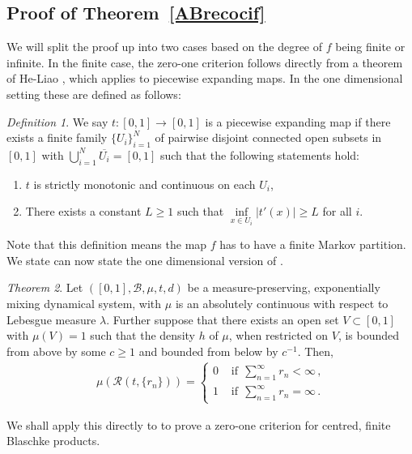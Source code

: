 \documentclass[11pt,reqno]{amsart}
\newcommand{\0}{\mathbf{0}}
\newtheorem{theorem}{Theorem}
\newtheorem{definition}{Definition}
\theoremstyle{remark}
\numberwithin{equation}{section}
\newtheorem{theorem}{Theorem}[section]
\newtheorem{definition}[theorem]{Definition}
\theoremstyle{remark}
\numberwithin{equation}{section}
\newcommand{\cR}{\mathcal{R}}
\begin{document}
\subsection{Proof of Theorem~\ref{ABrecocif}}\label{proofrecocif} 
We will split the proof up into two cases based on the degree of $f$ being finite or infinite. In the finite case, the zero-one criterion follows directly from a theorem of He-Liao \cite[Theorem~1.4]{HeLi}, which applies to piecewise expanding maps.  In the one dimensional setting these are defined as follows:
\begin{definition}\label{pe} 
We say $t:[0,1] \to [0,1]$ is a piecewise expanding map if there exists a finite family $\{U_i\}_{i=1}^N$ of pairwise disjoint connected open subsets in $[0, 1]$ with $\bigcup_{i=1}^N \overline{U_i}=[0,1]$
such that the following statements
hold:
\begin{enumerate}
    \item  $t$ is
strictly monotonic and continuous on each $U_i$,
    \item There exists a constant $L \geq 1$ such that $\inf\limits_{x \in {U_i}}|t'(x)| \geq L$ for all $i$.
\end{enumerate}
\end{definition}
Note that this definition means the map $f$ has to have a finite Markov partition.
We state can now state the one dimensional version of \cite[Theorem~1.4]{HeLi}.
\begin{theorem}\label{hl}
Let $([0,1], \mathcal{B},\mu,t,d)$ be a measure-preserving, exponentially mixing dynamical system, with $\mu$ is an absolutely continuous with respect to Lebesgue measure $\lambda$. Further suppose that there exists an open set $V \subset [0,1]$ with $\mu(V) = 1$ such that the density $h$ of $\mu$, when restricted on $V$, is bounded from above by some $c \geq 1$ and bounded from below by $c^{-1}$.
 Then, 
\begin{eqnarray}\
   \mu(\cR(t,\{r_n\} ))= \begin{cases}
        0 &\text{ \ if}\ \  \sum_{n=1}^\infty r_n <\infty \, ,\\[2ex]
        1 &\text{ \ if}\ \  \sum_{n=1}^\infty r_n
        =\infty \, .
    \end{cases}
	\end{eqnarray}
\end{theorem}
We shall apply this directly to to prove a zero-one criterion for centred, finite Blaschke products. 
\end{document}
